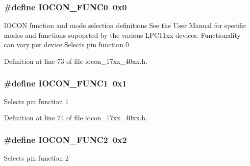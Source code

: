 \subsubsection[{\texorpdfstring{I\+O\+C\+O\+N\+\_\+\+F\+U\+N\+C0}{IOCON_FUNC0}}]{\setlength{\rightskip}{0pt plus 5cm}\#define I\+O\+C\+O\+N\+\_\+\+F\+U\+N\+C0~0x0}\hypertarget{group__IOCON__17XX__40XX_gab08f72eae45dd5656aeca24c346c8626}{}\label{group__IOCON__17XX__40XX_gab08f72eae45dd5656aeca24c346c8626}
I\+O\+C\+ON function and mode selection definitions See the User Manual for specific modes and functions supoprted by the various L\+P\+C11xx devices. Functionality can vary per device.\+Selects pin function 0 

Definition at line 73 of file iocon\+\_\+17xx\+\_\+40xx.\+h.

\subsubsection[{\texorpdfstring{I\+O\+C\+O\+N\+\_\+\+F\+U\+N\+C1}{IOCON_FUNC1}}]{\setlength{\rightskip}{0pt plus 5cm}\#define I\+O\+C\+O\+N\+\_\+\+F\+U\+N\+C1~0x1}\hypertarget{group__IOCON__17XX__40XX_gab6449233bd56957c684b9ad694606e3a}{}\label{group__IOCON__17XX__40XX_gab6449233bd56957c684b9ad694606e3a}
Selects pin function 1 

Definition at line 74 of file iocon\+\_\+17xx\+\_\+40xx.\+h.

\subsubsection[{\texorpdfstring{I\+O\+C\+O\+N\+\_\+\+F\+U\+N\+C2}{IOCON_FUNC2}}]{\setlength{\rightskip}{0pt plus 5cm}\#define I\+O\+C\+O\+N\+\_\+\+F\+U\+N\+C2~0x2}\hypertarget{group__IOCON__17XX__40XX_ga43ebb7abf055ce2491fbba5ef72f6fc7}{}\label{group__IOCON__17XX__40XX_ga43ebb7abf055ce2491fbba5ef72f6fc7}
Selects pin function 2 

